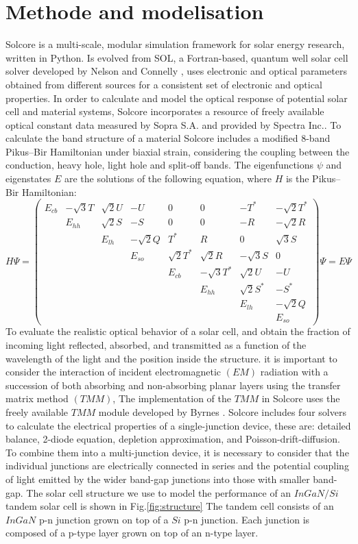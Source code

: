 \documentclass[preprint,12pt]{elsarticle}
\begin{document}
\section{Methode and modelisation} \label{sec:M_m}
Solcore is a multi-scale, modular simulation framework for solar energy research, written in Python. Is evolved from SOL, a Fortran-based, quantum well solar cell solver developed by Nelson and Connelly \cite{book1}, uses electronic and optical parameters obtained from different sources for a consistent set of electronic and optical properties. In order to calculate and model the optical response of potential solar cell and material systems, Solcore incorporates a resource of freely available optical constant data measured by Sopra S.A. and provided by Spectra Inc.\cite{sopra2008optical}. To calculate the band structure of a material Solcore includes a modified 8-band Pikus–Bir Hamiltonian under biaxial strain, considering the coupling between the conduction, heavy hole, light hole and split-off bands. The eigenfunctions $\psi$ and eigenstates $E$ are the solutions of the following equation, where $H$ is the Pikus–Bir Hamiltonian:
$$ H\Psi =\begin{pmatrix}
		E_{cb} & -\sqrt{3}T & \sqrt{2}U & -U & 0 & 0 & -T^{*}  & -\sqrt{2}T^{*}  \\
		& E_{hh} & \sqrt{2}S & -S & 0 & 0 & -R & -\sqrt{2}R \\
		&  & E_{lh}& -\sqrt{2}Q & T^{*} & R & 0 & \sqrt{3}S \\
		&  &  & E_{so} & \sqrt{2}T^{*} & \sqrt{2}R & -\sqrt{3}S & 0 \\
		&  &  &  & E_{cb} & -\sqrt{3}T^{*} & \sqrt{2}U & -U \\
		&  &  &  &  & E_{hh} & \sqrt{2}S^{*} & -S^{*} \\
		&  &  &  &  &  & E_{lh} & -\sqrt{2}Q \\
		&  &  &  &  &  &  & E_{so}
\end{pmatrix} \Psi = E\Psi $$
To evaluate the realistic optical behavior of a solar cell, and obtain the fraction of incoming light reflected, absorbed, and transmitted as a function of the wavelength of the light and the position inside the structure. it is important to consider the interaction of incident electromagnetic $(EM)$ radiation with a succession of both absorbing and non-absorbing planar layers using the  transfer matrix method $(TMM)$, The implementation of the $TMM$ in Solcore uses the freely available $TMM$ module developed by Byrnes \cite{byrnes2016multilayer}. Solcore includes four solvers to calculate the electrical properties of a single-junction device, these are: detailed balance, 2-diode equation, depletion approximation, and Poisson-drift-diffusion. To combine them into a multi-junction device, it is necessary to consider that the individual junctions are electrically connected in series and the potential coupling of light emitted by the wider band-gap junctions into those with smaller band-gap. The solar cell structure we use to model the performance of an $InGaN/Si$ tandem solar cell is shown in Fig.\ref{fig:structure} The tandem cell consists of an $InGaN$ p-n junction grown on top of a $Si$ p-n junction. Each junction is composed of a p-type layer grown on top of an n-type layer. 
\end{document}
